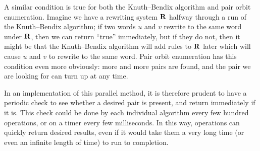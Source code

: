 A similar condition is true for both the Knuth--Bendix algorithm and pair orbit enumeration.
Imagine we have a rewriting system $\mathbf{R}$ halfway through a run of the Knuth--Bendix algorithm;
if two words $u$ and $v$ rewrite to the same word under $\mathbf{R}$, then we can
return ``true'' immediately, but if they do not, then it might be that
the Knuth--Bendix algorithm will add rules to $\mathbf{R}$ later which will cause $u$ and $v$ to
rewrite to the same word.  Pair orbit enumeration has this condition even more
obviously: more and more pairs are found, and the pair we are looking for can
turn up at any time.

In an implementation of this parallel method, it is therefore prudent to
have a periodic check to see whether a desired pair is present, and return
immediately if it is.  This check could be done by each individual algorithm
every few hundred operations, or on a timer every few milliseconds.  In this
way, operations can quickly return desired results, even if it would take them a
very long time (or even an infinite length of time) to run to completion.




